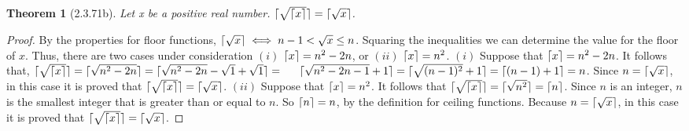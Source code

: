 \documentclass[a4paper, 12pt]{article}
\theoremstyle{plain}
\newtheorem*{theorem*}{Theorem}
\DeclarePairedDelimiter{\ceil}{\lceil}{\rceil}
\begin{document}
	
	\begin{theorem*}[2.3.71b]
		Let x be a positive real number. $\ceil{\sqrt{\ceil{x}}} = \ceil{\sqrt{x}}$.
	\end{theorem*}
	
	\begin{proof}
		By the properties for floor functions, \newline $\ceil{\sqrt{x}} \iff n-1 < \sqrt{x} \le n$. Squaring the inequalities we can determine the value for the floor of $x$. Thus, there are two cases under consideration $(i)$ $\ceil{x} = n^{2} - 2n$, or $(ii)$ $\ceil{x} = n^{2}$.
		\newline
		\newline
		\indent $(i)$ Suppose that $\ceil{x} = n^{2} - 2n$. It follows that, \newline \indent $\ceil{\sqrt{\ceil{x}}} = \ceil{\sqrt{n^{2} - 2n}} = \ceil{\sqrt{n^{2} - 2n} - \sqrt{1} + \sqrt{1}} = \newline \indent \ceil{\sqrt{n^{2} - 2n - 1} + 1} = \ceil{\sqrt{(n-1)^{2}} + 1} = \ceil{(n-1)+1} = n$. Since \indent $n = \ceil{\sqrt{x}}$, in this case it is proved that $\ceil{\sqrt{\ceil{x}}} = \ceil{\sqrt{x}}$.
		\newline
		\newline
		\indent
		$(ii)$ Suppose that $\ceil{x} = n^{2}$. It follows that $\ceil{\sqrt{\ceil{x}}} = \ceil{\sqrt{n^{2}}} = \ceil{n}$. \indent Since $n$ is an integer, $n$ is the smallest integer that is greater than or \indent equal to $n$. So $\ceil{n} = n$, by the definition for ceiling functions. Because \indent $n = \ceil{\sqrt{x}}$, in this case it is proved that $\ceil{\sqrt{\ceil{x}}} = \ceil{\sqrt{x}}$.
	\end{proof}
\end{document}
